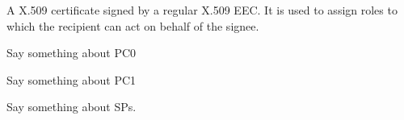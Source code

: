 \begin{acronym}



	A X.509 certificate signed by a regular X.509 EEC. It is used to assign roles
	to which the recipient can act on behalf of the signee.

	Say something about PC0
	
	Say something about PC1
	
	




	Say something about SPs.



\end{acronym}
